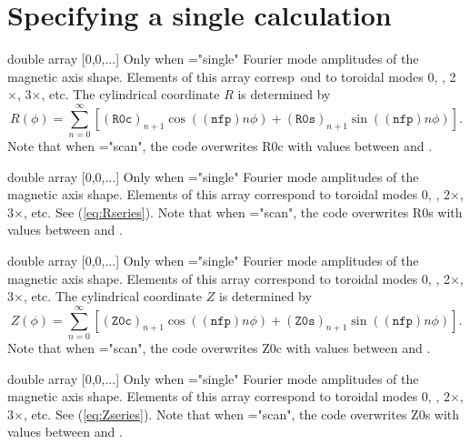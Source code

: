 \section{Specifying a single calculation}

{double array}
{[0,0,...]}
{Only when ={\ttfamily "single"}}
{Fourier mode amplitudes of the magnetic axis shape. Elements of this array corresp\
ond to toroidal modes 0, , 2$\times$, 3$\times$, etc.  The cylindrical coordinate $R$ is determined by
\begin{equation}
R(\phi) = \sum_{n=0}^{\infty} \left[ (\mathtt{R0c})_{n+1} \cos( (\mathtt{nfp})n\phi) +  (\mathtt{R0s})_{n+1} \sin( (\mathtt{nfp})n\phi)\right].
\label{eq:Rseries}
\end{equation}
Note that when ={\ttfamily "scan"}, the code overwrites {\ttfamily R0c} with values between  and .
}

\myhrule

{double array}
{[0,0,...]}
{Only when ={\ttfamily "single"}}
{Fourier mode amplitudes of the magnetic axis shape. Elements of this array correspond to toroidal modes 0, , 2$\times$, 3$\times$, etc. See (\ref{eq:Rseries}).
Note that when \parlink{general\_option}={\ttfamily "scan"}, the code overwrites {\ttfamily R0s} with values between \parlink{R0s\_min} and \parlink{R0s\_max}.
}

\myhrule

{double array}
{[0,0,...]}
{Only when ={\ttfamily "single"}}
{Fourier mode amplitudes of the magnetic axis shape. Elements of this array correspond to toroidal modes 0, , 2$\times$, 3$\times$, etc. The cylindrical coordinate $Z$ is determined by
\begin{equation}
Z(\phi) = \sum_{n=0}^{\infty} \left[ (\mathtt{Z0c})_{n+1} \cos((\mathtt{nfp})n \phi) +  (\mathtt{Z0s})_{n+1} \sin((\mathtt{nfp})n \phi)\right].
\label{eq:Zseries}
\end{equation}
Note that when ={\ttfamily "scan"}, the code overwrites {\ttfamily Z0c} with values between  and .
}

\myhrule

{double array}
{[0,0,...]}
{Only when ={\ttfamily "single"}}
{Fourier mode amplitudes of the magnetic axis shape. Elements of this array correspond to toroidal modes 0, , 2$\times$, 3$\times$, etc. See (\ref{eq:Zseries}).
Note that when \parlink{general\_option}={\ttfamily "scan"}, the code overwrites {\ttfamily Z0s} with values between \parlink{Z0s\_min} and \parlink{Z0s\_max}.
}

